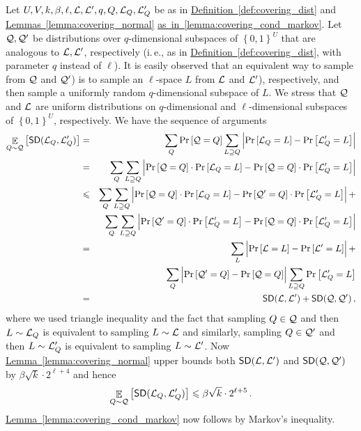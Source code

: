 \documentclass[11pt]{article}
\numberwithin{equation}{section}
\theoremstyle{definition}
\theoremstyle{plain}
\newcommand{\ie}{i.\,e.}
\newcommand{\expref}[2]{\hyperref[#2]{#1~\ref{#2}}}
\newcommand\set[1]{{\left\{ #1 \right\}}}
\newcommand\Prob[2]{{\Pr_{#1}\left[ {#2} \right]}}
\newcommand\power[1]{\set{0,1}^{#1}}
\newcommand\Expect[2]{{\mathop{\mathbb{E}}_{#1}\left[ {#2} \right]}}
\renewcommand\leq{\leqslant}
\begin{document}
Let $U, V, k, \beta, \ell, {\cal L}, {\cal L}', q, Q, {\cal L}_Q, {\cal L}'_Q$ be as in \expref{Definition}{def:covering_dist} and \expref{Lemmas}{lemma:covering_normal}
\expref{as~in}{lemma:covering_cond_markov}.  %
Let ${\cal Q}, {\cal Q}'$ be
distributions over $q$-dimensional subspaces of $\power{U}$ that are analogous to ${\cal L}, {\cal L}'$, respectively %
(\ie, as in \expref{Definition}{def:covering_dist}, with
parameter $q$ instead of $\ell$). It is easily observed that an equivalent way to sample
%
%
from ${\cal Q}$ and ${\cal Q}'$) is to sample an $\ell$-space $L$
from ${\cal L}$ and ${\cal L}'$), respectively,  %
and then sample a uniformly random $q$-dimensional subspace of $L$.
We stress that ${\cal Q}$ and ${\cal L}$ are
uniform distributions on $q$-dimensional and $\ell$-dimensional subspaces
of $\power{U}$, respectively.  %
We have the sequence of arguments
\begin{eqnarray*}
\Expect{Q \sim {\cal Q}}{{\sf SD}({\cal L}_Q, {\cal L}'_Q) } & = & \sum_{Q} \Prob{}{{\cal Q}=Q} \sum_{L \supseteq Q} \left| \Prob{}{{\cal L}_Q = L} - \Prob{}{{\cal L}'_Q = L} \right| \\
 & = & \sum_{Q} \sum_{L \supseteq Q} \left|  \Prob{}{{\cal Q}=Q} \cdot \Prob{}{{\cal L}_Q = L} - \Prob{}{{\cal Q}=Q} \cdot \Prob{}{{\cal L}'_Q = L}       \right| \\
 & \leq &  \sum_{Q} \sum_{L \supseteq Q} \left|  \Prob{}{{\cal Q}=Q} \cdot \Prob{}{{\cal L}_Q = L} - \Prob{}{{\cal Q'}=Q} \cdot \Prob{}{{\cal L}'_Q = L}       \right| + \\
 &  &  \sum_{Q} \sum_{L \supseteq Q} \left|  \Prob{}{{\cal Q}'=Q} \cdot \Prob{}{{\cal L}'_Q = L} - \Prob{}{{\cal Q}=Q} \cdot \Prob{}{{\cal L}'_Q = L}       \right|  \\
 & = &  \sum_{L} \left| \Prob{}{{\cal L}=L} - \Prob{}{{\cal L}' = L} \right|  + \\
 & & \sum_Q \left| \Prob{}{{\cal Q}'=Q} - \Prob{}{{\cal Q}=Q} \right| \sum_{L \supseteq Q} \Prob{}{{\cal L}'_Q = L} \\
 & = & {\sf SD}({\cal L}, {\cal L}') + {\sf SD}( {\cal Q}, {\cal Q}')\,,%
\end{eqnarray*}
where we used triangle inequality and the fact that sampling $Q \in {\cal Q}$ and then $L \sim {\cal L}_Q$ is equivalent to sampling $L \sim {\cal L}$ and
similarly, sampling $Q \in {\cal Q}'$ and then $L \sim {\cal L}'_Q$ is equivalent to sampling $L \sim {\cal L}'$.  Now \expref{Lemma}{lemma:covering_normal} upper bounds both
${\sf SD}({\cal L}, {\cal L}')$ and $ {\sf SD}( {\cal Q}, {\cal Q}')$ by $\beta \sqrt{k} \cdot 2^{\ell+4}$ and hence
  $$ \Expect{Q \sim {\cal Q}}{{\sf SD}({\cal L}_Q, {\cal L}'_Q )} \leq  \beta \sqrt{k} \cdot 2^{\ell+5}\,.$$%
\expref{Lemma}{lemma:covering_cond_markov}  now follows by
Markov's inequality.%
%
%
\end{document}
